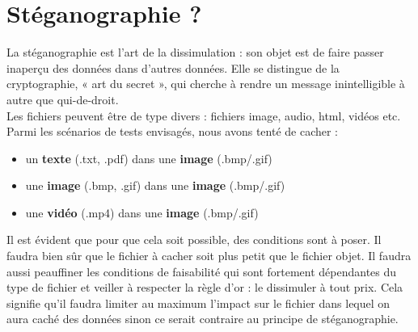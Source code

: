 \newpage
\section{Stéganographie ?}
La stéganographie est l'art de la dissimulation : son objet est de faire passer inaperçu des données dans d'autres données. 
Elle se distingue de la cryptographie, « art du secret », qui cherche à rendre un message inintelligible à autre que qui-de-droit.\\
Les fichiers peuvent être de type divers : fichiers image, audio, html, vidéos etc.\\
Parmi les scénarios de tests envisagés, nous avons tenté de cacher :\\

\begin{itemize}[label=$\diamond$, font=\LARGE \color{black}]
    \item un \textbf{texte} (.txt, .pdf) dans une \textbf{image} (.bmp/.gif)
    \item une \textbf{image} (.bmp, .gif) dans une \textbf{image} (.bmp/.gif)
    \item une \textbf{vidéo} (.mp4) dans une \textbf{image} (.bmp/.gif)\\
\end{itemize}


Il est évident que pour que cela soit possible, des conditions sont à poser.
Il faudra bien sûr que le fichier à cacher soit plus petit que le fichier objet. Il faudra aussi peauffiner les conditions de 
faisabilité qui sont fortement dépendantes du type de fichier et veiller à respecter la règle d'or : le dissimuler à tout prix.
Cela signifie qu'il faudra limiter au maximum l'impact sur le fichier dans lequel on aura caché des données sinon ce serait contraire
au principe de stéganographie.


